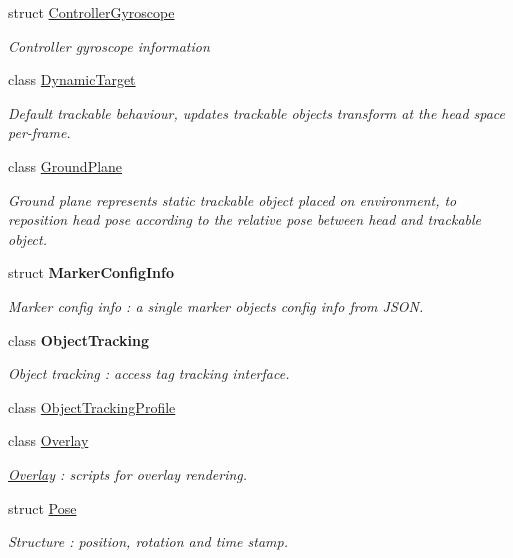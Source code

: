 \begin{DoxyCompactItemize}
struct \mbox{\hyperlink{struct_ximmerse_1_1_rhino_x_1_1_controller_gyroscope}{Controller\+Gyroscope}}
\begin{DoxyCompactList}\small\item\em Controller gyroscope information \end{DoxyCompactList}\item 
class \mbox{\hyperlink{class_ximmerse_1_1_rhino_x_1_1_dynamic_target}{Dynamic\+Target}}
\begin{DoxyCompactList}\small\item\em Default trackable behaviour, updates trackable object\textquotesingle{}s transform at the head space per-\/frame. \end{DoxyCompactList}\item 
class \mbox{\hyperlink{class_ximmerse_1_1_rhino_x_1_1_ground_plane}{Ground\+Plane}}
\begin{DoxyCompactList}\small\item\em Ground plane represents static trackable object placed on environment, to reposition head pose according to the relative pose between head and trackable object. \end{DoxyCompactList}\item 
struct {\bfseries Marker\+Config\+Info}
\begin{DoxyCompactList}\small\item\em Marker config info \+: a single marker object\textquotesingle{}s config info from J\+S\+ON. \end{DoxyCompactList}\item 
class {\bfseries Object\+Tracking}
\begin{DoxyCompactList}\small\item\em Object tracking \+: access tag tracking interface. \end{DoxyCompactList}\item 
class \mbox{\hyperlink{class_ximmerse_1_1_rhino_x_1_1_object_tracking_profile}{Object\+Tracking\+Profile}}
\item 
class \mbox{\hyperlink{class_ximmerse_1_1_rhino_x_1_1_overlay}{Overlay}}
\begin{DoxyCompactList}\small\item\em \mbox{\hyperlink{class_ximmerse_1_1_rhino_x_1_1_overlay}{Overlay}} \+: scripts for overlay rendering. \end{DoxyCompactList}\item 
struct \mbox{\hyperlink{struct_ximmerse_1_1_rhino_x_1_1_pose}{Pose}}
\begin{DoxyCompactList}\small\item\em Structure \+: position, rotation and time stamp. \end{DoxyCompactList}\item 

\end{DoxyCompactItemize}
